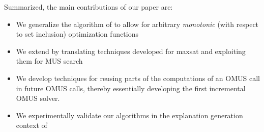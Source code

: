 Summarized, the main contributions of our paper are:
\begin{itemize}
  \item We generalize the algorithm of \citet{} to allow for arbitrary \emph{monotonic} (with respect to set inclusion) optimization functions
  \item We extend by translating techniques developed for maxsat \cite{davies} and exploiting them for MUS search
  \item We develop techniques for reusing parts of the computations of an OMUS call in future OMUS calls, thereby essentially developing the first incremental OMUS solver. 
  \item We experimentally validate our algorithms in the explanation generation context of \citet{}
\end{itemize}



